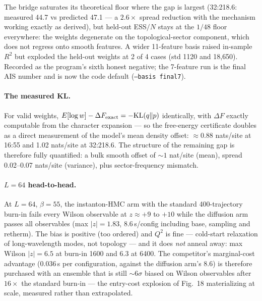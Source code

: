 The bridge saturates its theoretical floor where the gap is largest
(32:218.6: measured 44.7 vs predicted 47.1 --- a $2.6\times$ spread reduction
with the mechanism working exactly as derived), but held-out ESS$/N$ stays at
the $1/48$ floor everywhere: the weights degenerate on the topological-sector
component, which does not regress onto smooth features. A wider 11-feature
basis raised in-sample $R^2$ but exploded the held-out weights at 2 of 4
cases (std 1120 and 18{,}650). Recorded as the program's sixth honest
negative; the 7-feature run is the final AIS number and is now the code
default (\texttt{--basis final7}).

\paragraph{The measured KL.} For valid weights,
$E[\log w] - \Delta F_{\rm exact} = -{\rm KL}(q\|p)$ identically, with
$\Delta F$ exactly computable from the character expansion --- so the
free-energy certificate doubles as a direct measurement of the model's mean
density offset: ${\approx}0.88$ nats/site at 16:55 and 1.02 nats/site at
32:218.6. The structure of the remaining gap is therefore fully quantified: a
bulk smooth offset of ${\sim}1$ nat/site (mean), spread 0.02--0.07 nats/site
(variance), plus sector-frequency mismatch.

\paragraph{$L = 64$ head-to-head.} At $L = 64$, $\beta = 55$, the
instanton-HMC arm with the standard 400-trajectory burn-in fails every Wilson
observable at $z \approx +9$ to $+10$ while the diffusion arm passes all
observables (max $|z| = 1.83$, 8.6\,s/config including base, sampling and
retherm). The bias is positive (too ordered) and $Q^2$ is fine --- cold-start
relaxation of long-wavelength modes, not topology --- and it does \emph{not}
anneal away: max Wilson $|z| = 6.5$ at burn-in 1600 and 6.3 at 6400. The
competitor's marginal-cost advantage (0.036\,s per configuration, against the
diffusion arm's 8.6) is therefore purchased with an ensemble that is still
${\sim}6\sigma$ biased on Wilson observables after $16\times$ the standard
burn-in --- the entry-cost explosion of Fig.~18 materializing at scale,
measured rather than extrapolated.

